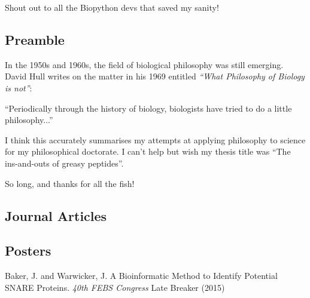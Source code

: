 \documentclass[12pt,PhD,twoside]{muthesis}
\begin{document}
Shout out to all the Biopython devs that saved my sanity!

\subsection*{Preamble}
In the 1950s and 1960s, the field of biological philosophy was still emerging. David Hull writes on the matter in his 1969 entitled {\it``What Philosophy of Biology is not''}:

\begin{displayquote}
``Periodically through the history of biology, biologists have tried to do
a little philosophy...'' \cite{Hull1969}
\end{displayquote}

I think this accurately summarises my attempts at applying philosophy to science for my philosophical doctorate. I can't help but wish my thesis title was ``The ins-and-outs of greasy peptides''.

So long, and thanks for all the fish!


\subsection*{Journal Articles} %

\subsection*{Posters}
Baker, J. and Warwicker, J. A Bioinformatic Method to Identify Potential SNARE Proteins. {\it 40th FEBS Congress} Late Breaker (2015)

\afterpreface %







\printglossary[type=\acronymtype,title=Abbreviations]
\printglossary[title=Nomenclature] %

\printbibliography[title={Bibliography}]

\end{document}
